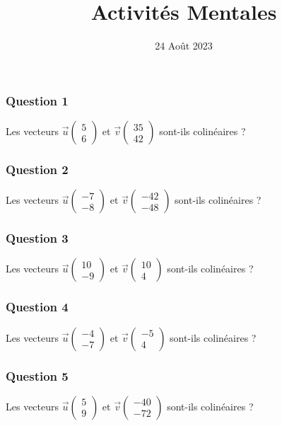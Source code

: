 \documentclass[15pt, mathserif]{beamer}
\title{Activités Mentales}
\date{24 Août 2023}
\begin{document}
\begin{frame}
    \titlepage
\end{frame}

\begin{frame} 
	\frametitle{Question 1}
Les vecteurs $\vec{u}\begin{pmatrix} 5 \\ 6 \end{pmatrix}$ et $\vec{v} \begin{pmatrix} 35 \\ 42 \end{pmatrix}$ sont-ils colinéaires ?\end{frame}


\begin{frame} 
	\frametitle{Question 2}
Les vecteurs $\vec{u}\begin{pmatrix} -7 \\ -8 \end{pmatrix}$ et $\vec{v} \begin{pmatrix} -42 \\ -48 \end{pmatrix}$ sont-ils colinéaires ?\end{frame}


\begin{frame} 
	\frametitle{Question 3}
Les vecteurs $\vec{u}\begin{pmatrix} 10 \\ -9 \end{pmatrix}$ et $\vec{v} \begin{pmatrix} 10 \\ 4 \end{pmatrix}$ sont-ils colinéaires ?\end{frame}


\begin{frame} 
	\frametitle{Question 4}
Les vecteurs $\vec{u}\begin{pmatrix} -4 \\ -7 \end{pmatrix}$ et $\vec{v} \begin{pmatrix} -5 \\ 4 \end{pmatrix}$ sont-ils colinéaires ?\end{frame}


\begin{frame} 
	\frametitle{Question 5}
Les vecteurs $\vec{u}\begin{pmatrix} 5 \\ 9 \end{pmatrix}$ et $\vec{v} \begin{pmatrix} -40 \\ -72 \end{pmatrix}$ sont-ils colinéaires ?\end{frame}
\end{document}
